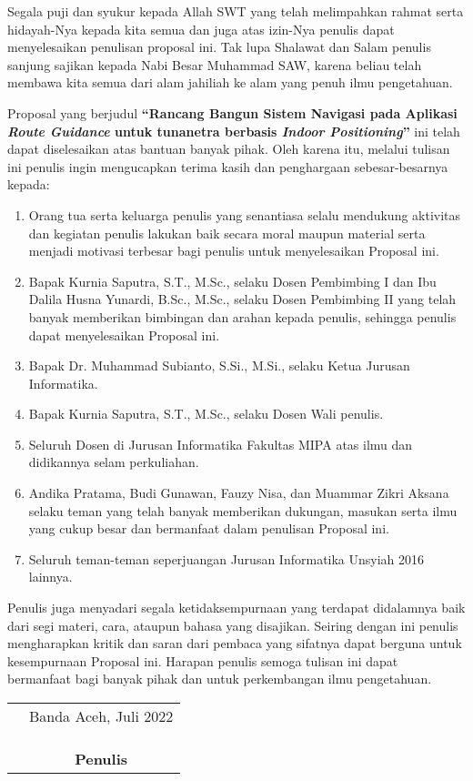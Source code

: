\preface %


Segala puji dan syukur kepada Allah SWT yang telah melimpahkan rahmat serta hidayah-Nya kepada kita semua dan juga atas izin-Nya penulis dapat menyelesaikan penulisan proposal ini. Tak lupa Shalawat dan Salam penulis sanjung sajikan kepada Nabi Besar Muhammad SAW, karena beliau telah membawa kita semua dari alam jahiliah ke alam yang penuh ilmu pengetahuan.

Proposal yang berjudul \textbf{“Rancang Bangun Sistem Navigasi pada Aplikasi \textit{Route Guidance} untuk tunanetra berbasis \textit{Indoor Positioning}”} ini telah dapat diselesaikan atas bantuan banyak pihak. Oleh karena itu, melalui tulisan ini penulis ingin mengucapkan terima kasih dan penghargaan sebesar-besarnya kepada:

\begin{enumerate}
	\item {Orang tua serta keluarga penulis yang senantiasa selalu mendukung aktivitas dan kegiatan penulis lakukan baik secara moral maupun material serta menjadi motivasi terbesar bagi penulis untuk menyelesaikan Proposal ini.}
	\item {Bapak Kurnia Saputra, S.T., M.Sc., selaku Dosen Pembimbing I dan Ibu Dalila Husna Yunardi, B.Sc., M.Sc., selaku Dosen Pembimbing II yang telah banyak memberikan bimbingan dan arahan kepada penulis, sehingga penulis dapat menyelesaikan Proposal ini.}
	\item {Bapak Dr. Muhammad Subianto, S.Si., M.Si., selaku Ketua Jurusan Informatika.}
	\item {Bapak Kurnia Saputra, S.T., M.Sc., selaku Dosen Wali penulis.}
	\item {Seluruh Dosen di Jurusan Informatika Fakultas MIPA atas ilmu dan didikannya selam perkuliahan.}
	\item {Andika Pratama, Budi Gunawan, Fauzy Nisa, dan Muammar Zikri Aksana selaku teman yang telah banyak memberikan dukungan, masukan serta ilmu yang cukup besar dan bermanfaat dalam penulisan Proposal ini. }
	\item{Seluruh teman-teman seperjuangan Jurusan Informatika Unsyiah 2016 lainnya.}
\end{enumerate}


Penulis juga menyadari segala ketidaksempurnaan yang terdapat didalamnya baik dari segi materi, cara, ataupun bahasa yang disajikan. Seiring dengan ini penulis mengharapkan kritik dan saran dari pembaca yang sifatnya dapat berguna untuk kesempurnaan Proposal ini. Harapan penulis semoga tulisan ini dapat bermanfaat bagi banyak pihak dan untuk perkembangan ilmu pengetahuan.

\vspace{1cm}


\begin{tabular}{p{7.5cm}c}
	&Banda Aceh, Juli 2022\\
	&\\
	&\\
	&\\
	&\textbf{Penulis}
\end{tabular}